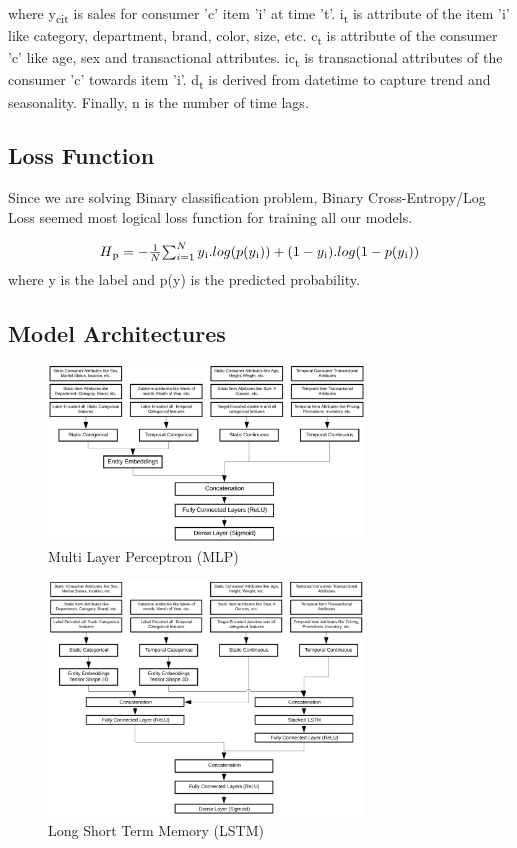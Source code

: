 where y\textsubscript{cit} is sales for consumer 'c' item ’i’ at time ’t’. 
i\textsubscript{t} is attribute of the item ’i’ like category, department, brand, color, size, etc. 
c\textsubscript{t} is attribute of the consumer 'c' like age, sex and transactional attributes. 
ic\textsubscript{t} is transactional attributes of the consumer 'c'  towards item 'i'. 
d\textsubscript{t} is derived from datetime to capture trend and seasonality. 
Finally, n is the number of time lags.

\subsection{Loss Function}
Since we are solving Binary classification problem, Binary Cross-Entropy/Log Loss seemed most logical loss function 
for training all our models.

  \begin{equation}
      \begin{array}{l}
        H\textsubscript{p} = - \frac{1}{N}$$\sum_{i=1}^{N}y\textsubscript{i}.log(p(y\textsubscript{i}))+
        (1- y\textsubscript{i}).log(1-p(y\textsubscript{i}))
      \end{array}
    \label{eqn:logloss}
  \end{equation}
where y is the label and p(y) is the predicted probability.

\subsection{Model Architectures}

  \begin{figure}[t]
    \centering 
    \includegraphics[width=3.3in]{img/MLP.png} 
    \caption{Multi Layer Perceptron (MLP)} 
    \label{fig:MLP} 
  \end{figure}

  \begin{figure}[t]
    \centering 
    \includegraphics[width=3.3in]{img/LSTM.png} 
    \caption{Long Short Term Memory (LSTM)} 
    \label{fig:LSTM} 
  \end{figure}

